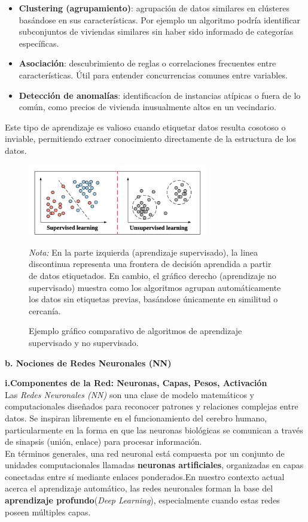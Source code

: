 \documentclass[11pt]{article} %
\begin{document}
\begin{itemize}
    \begin{itemize}
        \item \textbf{Clustering (agrupamiento)}: agrupación de datos similares en clústeres basándose en sus características. Por ejemplo un algoritmo podría identificar subconjuntos de viviendas similares sin haber sido informado de categorías específicas.
        \item\textbf{Asociación}: descubrimiento de reglas o correlaciones frecuentes entre características. Útil para entender concurrencias comunes entre variables.
        \item\textbf{Detección de anomalías}: identificacíon de instancias atípicas o fuera de lo común, como precios de vivienda inusualmente altos en un vecindario.
    \end{itemize}
    Este tipo de aprendizaje es valioso cuando etiquetar datos resulta cosotoso o inviable, permitiendo extraer conocimiento directamente de la estructura de los datos.
\end{itemize}
\begin{figure}[H]
\centering
\includegraphics[width=0.7\textwidth]{Images/Examples-of-Supervised-Learning-Linear-Regression-and-Unsupervised-Learning.png}
\caption{Ejemplo gráfico comparativo de algoritmos de aprendizaje supervisado y no supervisado.}
\label{fig:aprendizaje-supervisado-no-supervisado}
\vspace{2mm}
\small\textit{Nota:} En la parte izquierda (aprendizaje supervisado), la linea discontinua representa una frontera de decisión aprendida a partir de datos etiquetados. En cambio, el gráfico derecho (aprendizaje no supervisado) muestra como los algoritmos agrupan automáticamente los datos sin etiquetas previas, basándose únicamente en similitud o cercanía.
\end{figure}
\textbf{b. Nociones de Redes Neuronales (NN)}
\vspace{5pt}

\textbf{i.Componentes de la Red: Neuronas, Capas, Pesos,
Activación} \\[3pt]
Las \textit{Redes Neuronales (NN)} son una clase de modelo matemáticos y computacionales diseñados para reconocer patrones y relaciones complejas entre datos. Se inspiran libremente en el funcionamiento del cerebro humano, particularmente en la forma en que las neuronas biológicas se comunican a través de sinapsis (unión, enlace) para procesar información.\\
En términos generales, una red neuronal está compuesta por un conjunto de unidades computacionales llamadas \textbf{neuronas artificiales}, organizadas en capas conectadas entre sí mediante enlaces ponderados.En nuestro contexto actual acerca el aprendizaje automático, las redes neuronales forman la base del \textbf{aprendizaje profundo}(\textit{Deep Learning}), especialmente cuando estas redes poseen múltiples capas.
\end{document}
